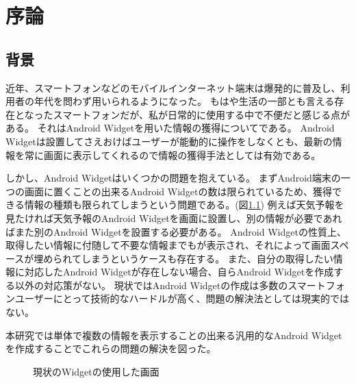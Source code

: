 \chapter{序論}
\label{chap:introduction}
\section{背景}


近年、スマートフォンなどのモバイルインターネット端末は爆発的に普及し、利用者の年代を問わず用いられるようになった。
もはや生活の一部とも言える存在となったスマートフォンだが、私が日常的に使用する中で不便だと感じる点がある。
それはAndroid Widgetを用いた情報の獲得についてである。
Android Widgetは設置してさえおけばユーザーが能動的に操作をしなくとも、最新の情報を常に画面に表示してくれるので情報の獲得手法としては有効である。

しかし、Android Widgetはいくつかの問題を抱えている。
まずAndroid端末の一つの画面に置くことの出来るAndroid Widgetの数は限られているため、獲得できる情報の種類も限られてしまうという問題である。(図\ref{fig:old_widget})
例えば天気予報を見たければ天気予報のAndroid Widgetを画面に設置し、別の情報が必要であればまた別のAndroid Widgetを設置する必要がある。
Android Widgetの性質上、取得したい情報に付随して不要な情報までもが表示され、それによって画面スペースが埋められてしまうというケースも存在する。
また、自分の取得したい情報に対応したAndroid Widgetが存在しない場合、自らAndroid Widgetを作成する以外の対応策がない。
現状ではAndroid Widgetの作成は多数のスマートフォンユーザーにとって技術的なハードルが高く、問題の解決法としては現実的ではない。

本研究では単体で複数の情報を表示することの出来る汎用的なAndroid Widgetを作成することでこれらの問題の解決を図った。

\begin{figure}[htbp]
  \begin{minipage}{\hsize}
    \begin{center}
    \end{center}
    \caption{現状のWidgetの使用した画面}
    \label{fig:old_widget}
  \end{minipage}
\end{figure}

